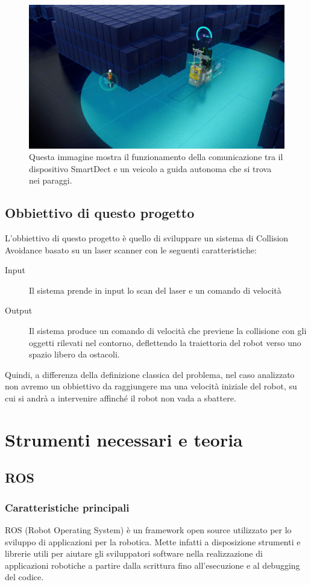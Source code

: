 \documentclass[Lau, binding=0.6cm, oneside]{sapthesis}
\begin{document}
\begin{figure}[H]
    \centering
    \includegraphics[width=12.5cm]{smart_dect.png}
    \caption{Questa immagine mostra il funzionamento della comunicazione tra il dispositivo SmartDect e un veicolo a guida autonoma che si trova nei paraggi.}
    \label{fig:smart_dect}
\end{figure}

\section{Obbiettivo di questo progetto}
L'obbiettivo di questo progetto è quello di sviluppare un sistema di Collision Avoidance basato su un laser scanner con le seguenti caratteristiche:
\begin{description}
	\item[Input] Il sistema prende in input lo scan del laser e un comando di velocità
	\item[Output] Il sistema produce un comando di velocità che previene la collisione con gli oggetti rilevati nel contorno, deflettendo la traiettoria del robot verso uno spazio libero da ostacoli.
\end{description}
Quindi, a differenza della definizione classica del problema, nel caso analizzato non avremo un obbiettivo da raggiungere ma una velocità iniziale del robot, su cui si andrà a intervenire affinché il robot non vada a sbattere.

\chapter{Strumenti necessari e teoria}
\section{ROS}
\subsection{Caratteristiche principali}
ROS (Robot Operating System) è un framework open source utilizzato per lo sviluppo di applicazioni per la robotica.
Mette infatti a disposizione strumenti e librerie utili per aiutare gli sviluppatori software nella realizzazione di applicazioni robotiche a partire dalla scrittura fino all’esecuzione e al debugging del codice.
\end{document}
